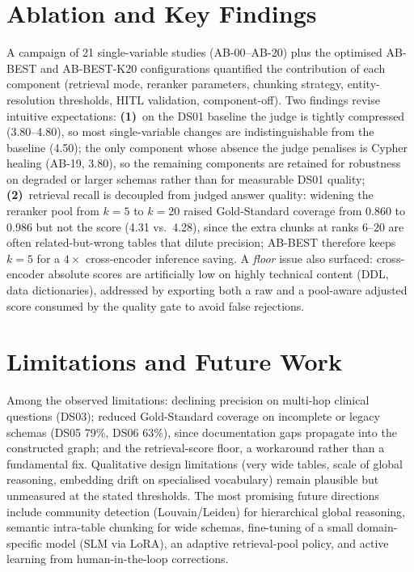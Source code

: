 \documentclass[11pt,a4paper]{article}
\begin{document}
\section{Ablation and Key Findings}

A campaign of 21 single-variable studies (AB-00--AB-20) plus the optimised AB-BEST and AB-BEST-K20 configurations quantified the contribution of each component (retrieval mode, reranker parameters, chunking strategy, entity-resolution thresholds, HITL validation, component-off). Two findings revise intuitive expectations: \textbf{(1)}~on the DS01 baseline the judge is tightly compressed (3.80--4.80), so most single-variable changes are indistinguishable from the baseline (4.50); the only component whose absence the judge penalises is Cypher healing (AB-19, 3.80), so the remaining components are retained for robustness on degraded or larger schemas rather than for measurable DS01 quality; \textbf{(2)}~retrieval recall is decoupled from judged answer quality: widening the reranker pool from $k{=}5$ to $k{=}20$ raised Gold-Standard coverage from 0.860 to 0.986 but not the score (4.31 vs.\ 4.28), since the extra chunks at ranks 6--20 are often related-but-wrong tables that dilute precision; AB-BEST therefore keeps $k{=}5$ for a $4\times$ cross-encoder inference saving. A \emph{floor} issue also surfaced: cross-encoder absolute scores are artificially low on highly technical content (DDL, data dictionaries), addressed by exporting both a raw and a pool-aware adjusted score consumed by the quality gate to avoid false rejections.

\section{Limitations and Future Work}

Among the observed limitations: declining precision on multi-hop clinical questions (DS03); reduced Gold-Standard coverage on incomplete or legacy schemas (DS05 79\%, DS06 63\%), since documentation gaps propagate into the constructed graph; and the retrieval-score floor, a workaround rather than a fundamental fix. Qualitative design limitations (very wide tables, scale of global reasoning, embedding drift on specialised vocabulary) remain plausible but unmeasured at the stated thresholds. The most promising future directions include community detection (Louvain/Leiden) for hierarchical global reasoning, semantic intra-table chunking for wide schemas, fine-tuning of a small domain-specific model (SLM via LoRA), an adaptive retrieval-pool policy, and active learning from human-in-the-loop corrections.
\end{document}
